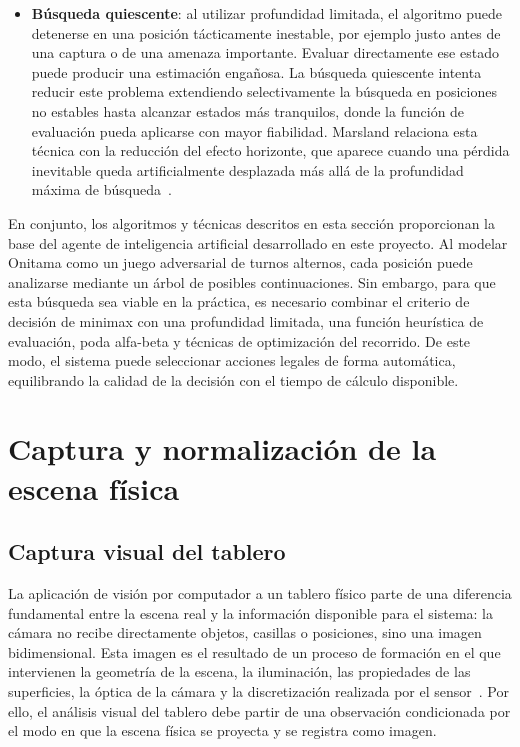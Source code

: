 \begin{itemize}
    \item \textbf{Búsqueda quiescente}: al utilizar profundidad limitada, el algoritmo puede detenerse en una posición tácticamente inestable, por ejemplo justo antes de una captura o de una amenaza importante. Evaluar directamente ese estado puede producir una estimación engañosa. La búsqueda quiescente intenta reducir este problema extendiendo selectivamente la búsqueda en posiciones no estables hasta alcanzar estados más tranquilos, donde la función de evaluación pueda aplicarse con mayor fiabilidad. Marsland relaciona esta técnica con la reducción del efecto horizonte, que aparece cuando una pérdida inevitable queda artificialmente desplazada más allá de la profundidad máxima de búsqueda~\cite{marsland1986gameTreePruning}.
\end{itemize}

En conjunto, los algoritmos y técnicas descritos en esta sección proporcionan la base del agente de inteligencia artificial desarrollado en este proyecto. Al modelar Onitama como un juego adversarial de turnos alternos, cada posición puede analizarse mediante un árbol de posibles continuaciones. Sin embargo, para que esta búsqueda sea viable en la práctica, es necesario combinar el criterio de decisión de minimax con una profundidad limitada, una función heurística de evaluación, poda alfa-beta y técnicas de optimización del recorrido. De este modo, el sistema puede seleccionar acciones legales de forma automática, equilibrando la calidad de la decisión con el tiempo de cálculo disponible.


\section{Captura y normalización de la escena física}
\label{sec:captura-normalizacion-escena-fisica}


\subsection{Captura visual del tablero}

La aplicación de visión por computador a un tablero físico parte de una diferencia fundamental entre la escena real y la información disponible para el sistema: la cámara no recibe directamente objetos, casillas o posiciones, sino una imagen bidimensional. Esta imagen es el resultado de un proceso de formación en el que intervienen la geometría de la escena, la iluminación, las propiedades de las superficies, la óptica de la cámara y la discretización realizada por el sensor~\cite{szeliski2022computerVision}. Por ello, el análisis visual del tablero debe partir de una observación condicionada por el modo en que la escena física se proyecta y se registra como imagen.

